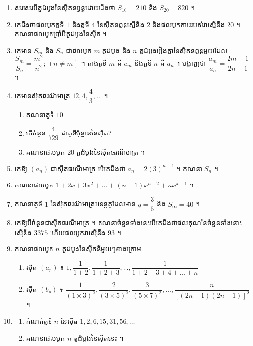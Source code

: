 \begin{enumerate}[1]
\begin{enumerate}[1]
\begin{tasks}
      \task ទាញរកផលធៀបរួមនៃស៊ីតនេះ ។
      \task គណនាតួទី $1$ $U_1$ នៃស៊ីត ។
    \end{tasks}
  \end{enumerate}
  \item សរសេរបីតួដំបូងនៃស៊ីតនព្វន្តដោយដឹងថា $S_{10} = 210$ និង $S_{20} = 820$ ។
  \item គេដឹងថាផលបូកតួទី $1$ និងតួទី $4$ នៃស៊ីតនព្វន្តស្មើនឹង $2$ និងផលបូកការេរបស់វាស្មើនឹង $20$ ។ គណនាផលបូកប្រាំបីតួដំបូងនៃស៊ីត ។
  \item គេមាន $S_m$ និង $S_n$ ជាផលបូក $m$ តួដំបូង និង $n$ តួដំបូងរៀងគ្នានៃស៊ីតនព្វន្តមួយដែល $\dfrac{S_m}{S_n} = \dfrac{m^2}{n^2}$; $(n \ne m)$ ។ តាងតួទី $m$ គឺ $a_m$ និងតួទី $n$ គឺ $a_n$ ។ បង្ហាញថា $\dfrac{a_m}{a_n} = \dfrac{2m - 1}{2n - 1}$ ។
  \item គេមានស៊ីតធរណីមាត្រ $12, 4, \dfrac{4}{3}, \ldots$ ។
  \begin{enumerate}[a]
    \item គណនាតួទី $10$
    \item តើចំនួន $\dfrac{4}{729}$ ជាតួទីប៉ុន្មាននៃស៊ីត?
    \item គណនាផលបូក $20$ តួដំបូងនៃស៊ីតធរណីមាត្រ ។
  \end{enumerate}
  \item គេឱ្យ $(a_n)$ ជាស៊ីតធរណីមាត្រ បើគេដឹងថា $a_n = 2(3)^{n-1}$ ។ គណនា $S_n$ ។
  \item គណនាផលបូក $1 + 2x + 3x^2 + \ldots + (n - 1)x^{n-2} + nx^{n-1}$ ។
  \item គណនាតួទី $1$ នៃស៊ីតធរណីមាត្រអនន្តតួដែលមាន $q = \dfrac{3}{5}$ និង $S_\infty = 40$ ។
  \item គេឱ្យបីចំនួនជាស៊ីតធរណីមាត្រ ។ គណនាចំនួនទាំងនេះបើគេដឹងថាផលគុណនៃចំនួនទាំងនោះស្មើនឹង $3375$ ហើយផលបូកវាស្មើនឹង $93$ ។
  \item គណនាផលបូក $n$ តួដំបូងនៃស៊ីតនីមួយៗខាងក្រោម
  \begin{enumerate}[a]
    \item ស៊ីត $(a_n)$ ៖ $1, \dfrac{1}{1 + 2}, \dfrac{1}{1 + 2 + 3}, \ldots, \dfrac{1}{1 + 2 + 3 + 4 + \ldots + n}$
    \item ស៊ីត $(b_n)$ ៖ $\dfrac{1}{(1 \times 3)^2}, \dfrac{2}{(3 \times 5)^2}, \dfrac{3}{(5 \times 7)^2}, \ldots, \dfrac{n}{[(2n - 1)(2n + 1)]^2}$ ។
  \end{enumerate}
  \item
  \begin{enumerate}[a]
    \item កំណត់តួទី $n$ នៃស៊ីត $1, 2, 6, 15, 31, 56, \ldots$
    \item គណនាផលបូក $n$ តួដំបូងនៃស៊ីតនេះ ។

\end{enumerate}
\end{enumerate}
